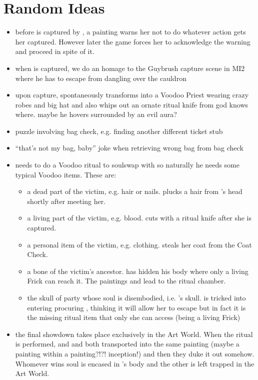 \documentclass{article}
\begin{document}
\section{Random Ideas}
\begin{itemize}
  \item before \cyl{} is captured by \cfrick{}, a painting warns her not to do whatever action gets her captured. However later the game forces her to acknowledge the warning and proceed in spite of it.
  \item when \cyl{} is captured, we do an homage to the Guybrush capture scene in MI2 where he has to escape from dangling over the cauldron
  \item upon capture, \iaudioguide{} spontaneously transforms into a Voodoo Priest wearing crazy robes and big hat and also whips out an ornate ritual knife from god knows where. maybe he hovers surrounded by an evil aura?
  \item puzzle involving bag check, e.g. finding another different ticket stub
  \item ``that's not my bag, baby'' joke when retrieving wrong bag from bag check
  \item \cfrick{} needs to do a Voodoo ritual to soulswap with \cyl{} so naturally he needs some typical Voodoo items. These are:
    \begin{itemize}
      \item a dead part of the victim, e.g. hair or nails. \ccurator{} plucks a hair from \cyl{}'s head shortly after meeting her.
      \item a living part of the victim, e.g. blood. \iaudioguide{} cuts \cyl{} with a ritual knife after she is captured.
      \item a personal item of the victim, e.g. clothing. \ccurator{} steals her coat from the Coat Check.
      \item a bone of the victim's ancestor. \cfrick{} has hidden his body where only a living Frick can reach it. The paintings and \iaudioguide{} lead \cyl{} to the ritual chamber.
      \item the skull of party whose soul is disembodied, i.e. \cfrick{}'s skull. \cyl{} is tricked into entering procuring \ifrickskull{}, thinking it will allow her to escape but in fact it is the missing ritual item that only she can access (being a living Frick)
    \end{itemize}
  \item the final showdown takes place exclusively in the Art World. When the ritual is performed, \cyl{} and \cfrick{} and both transported into the same painting (maybe a painting within a painting?!?! inception!) and then they duke it out somehow. Whomever wins soul is encased in \cyl{}'s body and the other is left trapped in the Art World.

\end{itemize}
\end{document}
